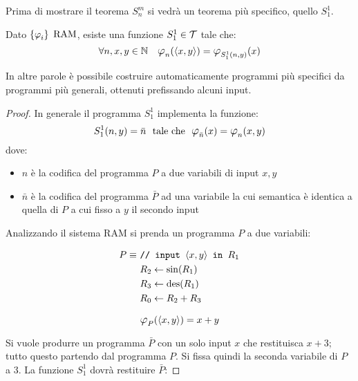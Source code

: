 Prima di mostrare il teorema $S_n^m$ si vedrà un teorema più specifico, quello
$S_1^1$.
\begin{theorem}[$S_1^1$]
    Dato $\sistProg$ $\text{RAM}$, esiste una funzione $S_1^1\in\mathcal{T}$ tale che:
    $$ \forall n,x,y\in\N \quad \semanticaRAM_n(\cantor{x,y})
    = \semanticaRAM_{S_1^1(n,y)}(x) $$
\end{theorem}
In altre parole è possibile costruire automaticamente programmi più specifici
da programmi più generali, ottenuti prefissando alcuni input.
\begin{proof}
In generale il programma $S_1^1$ implementa la funzione:
$$ S_1^1(n,y) = \bar{n} \ \text{ tale che } \ \semanticaRAM_{\bar{n}}(x)
=\semanticaRAM_n (x,y)$$
dove:
\begin{itemize}
    \item $n$ è la codifica del programma $P$ a due variabili di input $x,y$
    \item $\bar{n}$ è la codifica del programma $\bar{P}$ ad una variabile
        la cui semantica è identica a quella di $P$ a cui fisso a $y$ il
        secondo input
\end{itemize}

Analizzando il sistema RAM si prenda un programma $P$ a due variabili:

\vspace{-1em}
\begin{minipage}{.4\textwidth}
    \begin{align}
        P \equiv\ & \texttt{// input $\langle x,y\rangle$ in $R_1$}   \notag\\
        & R_2 \leftarrow \sin(R_1)                     \notag\\
        & R_3 \leftarrow \text{des}(R_1)                      \notag\\
        & R_0 \leftarrow R_2+R_3                       \notag
    \end{align}
\end{minipage}
\begin{minipage}{.4\textwidth}
    $$ \semanticaRAM_P(\cantor{x,y})=x+y $$
\end{minipage}

Si vuole produrre un programma $\bar{P}$ con un solo input $x$ che restituisca
$x+3$; tutto questo partendo dal programma $P$. Si fissa quindi la seconda variabile
di $P$ a 3. La funzione $S_1^1$ dovrà restituire $\bar{P}$:


\end{proof}
